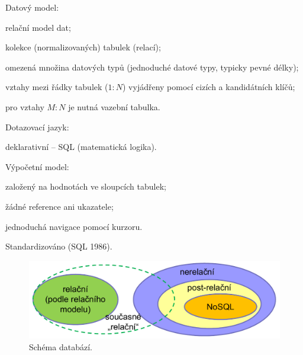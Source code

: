 \begin{compactitem}
    \item Datový model: \begin{compactitem}
        \item relační model dat;
        \item kolekce (normalizovaných) tabulek (relací);
        \item omezená množina datových typů (jednoduché datové typy, typicky pevné délky);
        \item vztahy mezi řádky tabulek ($1:N$) vyjádřeny pomocí cizích a kandidátních klíčů;
        \item pro vztahy $M:N$ je nutná vazební tabulka.
    \end{compactitem}

    \item Dotazovací jazyk:\begin{compactitem}
        \item deklarativní -- SQL (matematická logika).
    \end{compactitem}

    \item Výpočetní model: \begin{compactitem}
        \item založený na hodnotách ve sloupcích tabulek;
        \item žádné reference ani ukazatele;
        \item jednoduchá navigace pomocí kurzoru.
    \end{compactitem}

    \item Standardizováno (SQL 1986).
\end{compactitem}

\begin{figure}[H]
    \centering
    \includegraphics[width=1\linewidth]{postrelacni.pdf}
    \caption{Schéma databází.}
\end{figure}


